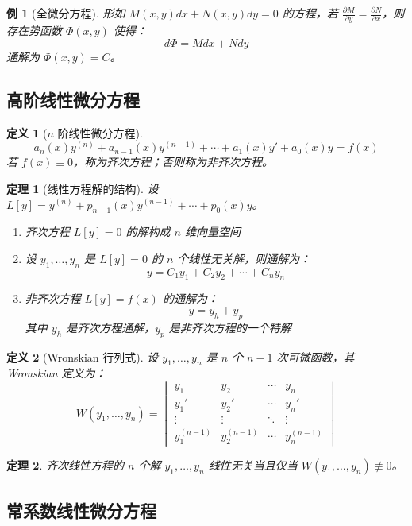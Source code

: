 \documentclass[12pt]{article}
\newtheorem{theorem}{定理}[section]
\newtheorem{definition}{定义}[section]
\newtheorem{example}{例}[section]
\begin{document}
\begin{example}[全微分方程]
形如 $M(x,y)dx + N(x,y)dy = 0$ 的方程，若 $\frac{\partial M}{\partial y} = \frac{\partial N}{\partial x}$，则存在势函数 $\Phi(x,y)$ 使得：
$$d\Phi = Mdx + Ndy$$
通解为 $\Phi(x, y) = C$。
\end{example}

\subsection{高阶线性微分方程}

\begin{definition}[$n$ 阶线性微分方程]
$$a_n(x)y^{(n)} + a_{n-1}(x)y^{(n-1)} + \cdots + a_1(x)y' + a_0(x)y = f(x)$$
若 $f(x) \equiv 0$，称为齐次方程；否则称为非齐次方程。
\end{definition}

\begin{theorem}[线性方程解的结构]
设 $L[y] = y^{(n)} + p_{n-1}(x)y^{(n-1)} + \cdots + p_0(x)y$。

\begin{enumerate}
\item 齐次方程 $L[y] = 0$ 的解构成 $n$ 维向量空间
\item 设 $y_1, \ldots, y_n$ 是 $L[y] = 0$ 的 $n$ 个线性无关解，则通解为：
$$y = C_1 y_1 + C_2 y_2 + \cdots + C_n y_n$$
\item 非齐次方程 $L[y] = f(x)$ 的通解为：
$$y = y_h + y_p$$
其中 $y_h$ 是齐次方程通解，$y_p$ 是非齐次方程的一个特解
\end{enumerate}
\end{theorem}

\begin{definition}[Wronskian 行列式]
设 $y_1, \ldots, y_n$ 是 $n$ 个 $n-1$ 次可微函数，其 Wronskian 定义为：
$$W(y_1, \ldots, y_n) = \begin{vmatrix}
y_1 & y_2 & \cdots & y_n \\
y_1' & y_2' & \cdots & y_n' \\
\vdots & \vdots & \ddots & \vdots \\
y_1^{(n-1)} & y_2^{(n-1)} & \cdots & y_n^{(n-1)}
\end{vmatrix}$$
\end{definition}

\begin{theorem}
齐次线性方程的 $n$ 个解 $y_1, \ldots, y_n$ 线性无关当且仅当 $W(y_1, \ldots, y_n) \not\equiv 0$。
\end{theorem}

\subsection{常系数线性微分方程}
\end{document}
